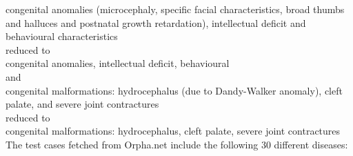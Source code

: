 congenital anomalies (microcephaly, specific facial characteristics, broad thumbs and halluces and postnatal growth retardation), intellectual deficit and behavioural characteristics \\

reduced to \\

congenital anomalies, intellectual deficit, behavioural \\

and  \\

congenital malformations: hydrocephalus (due to Dandy-Walker anomaly), cleft palate, and severe joint contractures \\

reduced to \\

congenital malformations: hydrocephalus, cleft palate, severe joint contractures \\

The test cases fetched from Orpha.net include the following 30 different diseases: 

